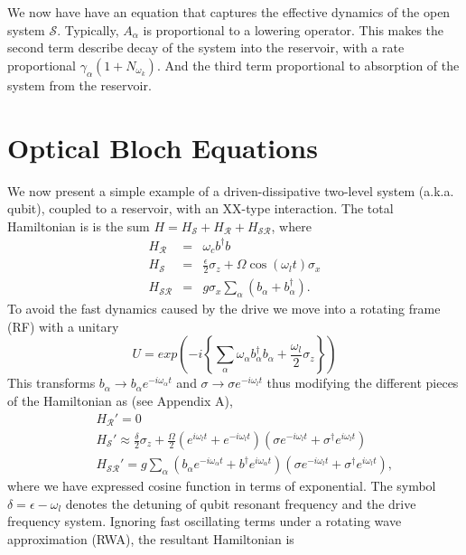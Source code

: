 We now have have an equation that captures the effective dynamics of the open system $\mathcal{S}$. Typically, $A_\alpha$ is proportional to a lowering operator. This makes the second term describe decay of the system into the reservoir, with a rate proportional $\gamma_\alpha(1+N_{\omega_k})$.  And the third term proportional to absorption of the system from the reservoir.
%
\section{Optical Bloch Equations}
%
We now present a simple example of a driven-dissipative two-level system (a.k.a. qubit), coupled to a reservoir, with an XX-type interaction. The total Hamiltonian is is the sum $H=H_{\mathcal{S}} + H_{\mathcal{R}} + H_{\mathcal{SR}}$, where
%
\begin{eqnarray}
H_{\mathcal{R}} & = & \omega_c b^\dagger b \nonumber \\
H_{\mathcal{S}} & = & \frac{\epsilon}{2} \sigma_z + \Omega \cos( \omega_l t )\sigma_x \nonumber \\
H_{\mathcal{SR}} & = & g \sigma_{x} \sum_{\alpha} \left( b_{\alpha} + b_{\alpha}^\dagger \right).
\end{eqnarray}
%
To avoid the fast dynamics caused by the drive we move into a rotating frame (RF) with a unitary 
\begin{equation}
    U = exp\left(-i \left\{\sum_{\alpha} \omega_\alpha b_{\alpha}^\dagger b_{\alpha} + \frac{\omega_l}{2} \sigma_z\right\}\right)
\end{equation} 
%
This transforms $b_{\alpha} \rightarrow b_{\alpha}e^{-i \omega_{\alpha} t} $ and $\sigma \rightarrow \sigma e^{- i \omega_l t }$ thus modifying the different pieces of the Hamiltonian as (see Appendix A),
%
\begin{eqnarray}
& & H_{\mathcal{R}}' = 0 \nonumber \\
& & H_{\mathcal{S}}' \approx \frac{\delta}{2} \sigma_z + \frac{\Omega}{2}(e^{i\omega_l t}+e^{-i\omega_l t})(\sigma e^{-i\omega_l t} + \sigma^{\dagger}e^{i\omega_l t})\nonumber \\
& & H_{\mathcal{SR}}' =  g\sum_{\alpha} ( b_{\alpha} e^{- i \omega_{\alpha} t}+ b^\dagger e^{ i \omega_{\alpha} t} ) ( \sigma e^{ - i \omega_l t } + \sigma^\dagger e^{ i \omega_l t }),
\end{eqnarray}
%
where we have expressed cosine function in terms of exponential. The symbol ${\delta = \epsilon - \omega_l}$ denotes the detuning of qubit resonant frequency and the drive frequency system. Ignoring fast oscillating terms under a rotating wave approximation (RWA)\cite{RWA}, the resultant Hamiltonian is
